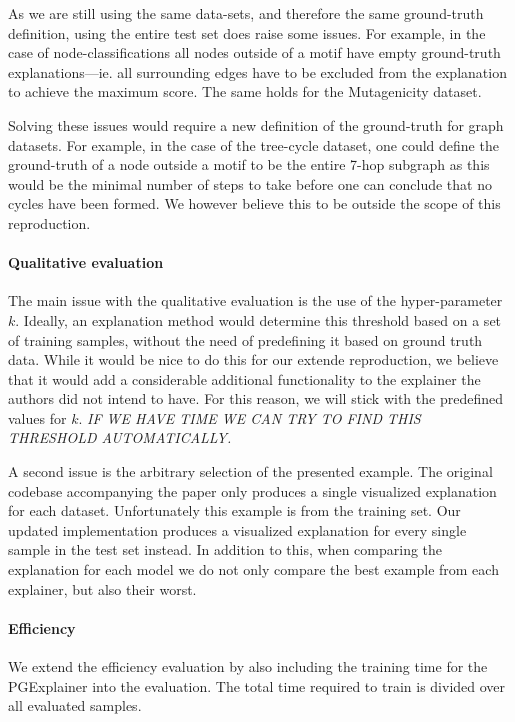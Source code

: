As we are still using the same data-sets, and therefore the same ground-truth definition, using the entire test set does raise some issues. For example, in the case of node-classifications all nodes outside of a motif have empty ground-truth explanations---ie. all surrounding edges have to be excluded from the explanation to achieve the maximum score. The same holds for the Mutagenicity dataset.

Solving these issues would require a new definition of the ground-truth for graph datasets. For example, in the case of the tree-cycle dataset, one could define the ground-truth of a node outside a motif to be the entire 7-hop subgraph as this would be the minimal number of steps to take before one can conclude that no cycles have been formed. We however believe this to be outside the scope of this reproduction. 

\paragraph{Qualitative evaluation}
The main issue with the qualitative evaluation is the use of the hyper-parameter $k$. Ideally, an explanation method would determine this threshold based on a set of training samples, without the need of predefining it based on ground truth data. While it would be nice to do this for our extende reproduction, we believe that it would add a considerable additional functionality to the explainer the authors did not intend to have. For this reason, we will stick with the predefined values for $k$. \textit{IF WE HAVE TIME WE CAN TRY TO FIND THIS THRESHOLD AUTOMATICALLY. }

A second issue is the arbitrary selection of the presented example. The original codebase accompanying the paper only produces a single visualized explanation for each dataset. Unfortunately this example is from the training set. Our updated implementation produces a visualized explanation for every single sample in the test set instead. In addition to this, when comparing the explanation for each model we do not only compare the best example from each explainer, but also their worst. 

\paragraph{Efficiency}
We extend the efficiency evaluation by also including the training time for the PGExplainer into the evaluation. The total time required to train is divided over all evaluated samples. 

